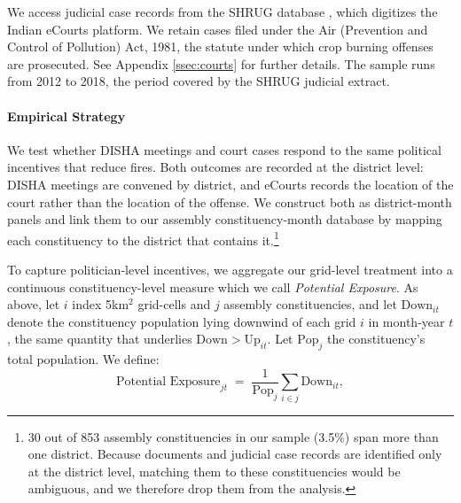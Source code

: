 \documentclass[12pt]{article}
\begin{document}

We access judicial case records from the SHRUG 
database \citep{aabbcdgns2025bias}, which digitizes the Indian eCourts platform. We retain cases filed under the Air (Prevention and Control of Pollution) Act, 1981, the statute under which crop burning offenses are prosecuted.  See Appendix \ref{ssec:courts} for further details. The sample runs from 2012 to 2018, the period covered by the SHRUG judicial extract.


\paragraph{Empirical Strategy}
We test whether DISHA meetings and court cases respond to the same political incentives that reduce fires. Both outcomes are recorded at the district level: DISHA meetings are convened by district, and eCourts records the location of the court rather than the location of the offense. We construct both as district-month panels and link them to our assembly constituency-month database by mapping each constituency to the district that contains it.\footnote{30 out of 853 assembly constituencies in our sample (3.5\%) span more than one district. Because documents and judicial case records are identified only at the district level, matching them to these constituencies would be ambiguous, and we therefore drop them from the analysis.}

To capture politician-level incentives, we aggregate our grid-level treatment into a continuous constituency-level measure which we call \emph{Potential Exposure}. As above, let $i$ index 5km$^2$ grid-cells and $j$ assembly constituencies, and let $\text{Down}_{it}$ denote the constituency population lying downwind of each grid $i$ in month-year $t$, the same quantity that underlies $\text{Down} > \text{Up}_{it}$. Let $\text{Pop}_j$ the constituency's total population. We define:
\begin{equation}
\text{Potential Exposure}_{jt} \;=\; \frac{1}{\text{Pop}_j} \sum_{i \in j} \text{Down}_{it},
\label{eq:potexposure}
\end{equation}
\end{document}
